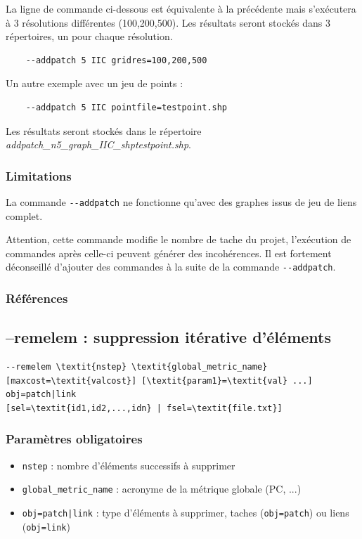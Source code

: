 \documentclass[a4paper,10pt]{report}
\begin{document}
La ligne de commande ci-dessous est équivalente à la précédente mais s'exécutera à 3 résolutions différentes (100,200,500). Les résultats seront stockés dans 3 répertoires, un pour chaque résolution.
\begin{Verbatim}
	--addpatch 5 IIC gridres=100,200,500
\end{Verbatim}

Un autre exemple avec un jeu de points :
\begin{Verbatim}
	--addpatch 5 IIC pointfile=testpoint.shp
\end{Verbatim}
Les résultats seront stockés dans le répertoire \textit{addpatch\_n5\_graph\_IIC\_shptestpoint.shp}.

\subsubsection{Limitations}
La commande \verb|--addpatch| ne fonctionne qu'avec des graphes issus de jeu de liens complet. 

Attention, cette commande modifie le nombre de tache du projet, l'exécution de commandes après celle-ci peuvent générer des incohérences.
Il est fortement déconseillé d'ajouter des commandes à la suite de la commande \verb|--addpatch|.

\subsubsection{Références}
\cite{2015_addpatch_rainette, 2014_LUP}


\subsection{--remelem : suppression itérative d'éléments}
\begin{Verbatim}[commandchars=\\\{\}]
--remelem \textit{nstep} \textit{global_metric_name} [maxcost=\textit{valcost}] [\textit{param1}=\textit{val} ...] obj=patch|link
[sel=\textit{id1,id2,...,idn} | fsel=\textit{file.txt}]
\end{Verbatim}

\subsubsection{Paramètres obligatoires}
\begin{itemize}
	\item \verb|nstep| : nombre d’éléments successifs à supprimer
	\item \verb|global_metric_name| : acronyme de la métrique globale (PC, ...)
	\item \verb+obj=patch|link+ : type d'éléments à supprimer, taches (\verb+obj=patch+) ou liens (\verb+obj=link+)
\end{itemize}
\end{document}
